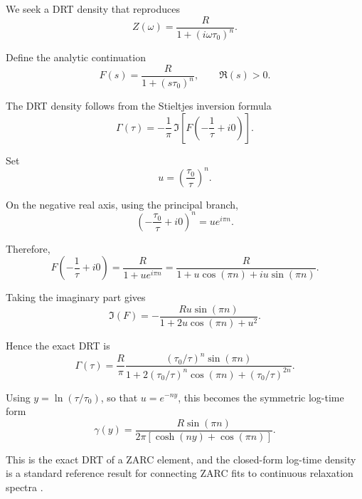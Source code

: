 \documentclass[11pt]{article}
\begin{document}
We seek a DRT density that reproduces
\begin{equation}
Z(\omega) = \frac{R}{1 + (i\omega\tau_0)^n}.
\end{equation}

Define the analytic continuation
\begin{equation}
F(s) = \frac{R}{1 + (s\tau_0)^n}, \qquad \Re(s) > 0.
\end{equation}

The DRT density follows from the Stieltjes inversion formula
\begin{equation}
\Gamma(\tau) = -\frac{1}{\pi} \, \Im\left[F\left(-\frac{1}{\tau} + i0\right)\right].
\end{equation}

Set
\begin{equation}
u = \left(\frac{\tau_0}{\tau}\right)^n.
\end{equation}

On the negative real axis, using the principal branch,
\begin{equation}
\left(-\frac{\tau_0}{\tau} + i0\right)^n = u e^{i\pi n}.
\end{equation}

Therefore,
\begin{equation}
F\left(-\frac{1}{\tau} + i0\right) = \frac{R}{1 + u e^{i\pi n}} = \frac{R}{1 + u\cos(\pi n) + i u\sin(\pi n)}.
\end{equation}

Taking the imaginary part gives
\begin{equation}
\Im(F) = -\frac{R u \sin(\pi n)}{1 + 2u\cos(\pi n) + u^2}.
\end{equation}

Hence the exact DRT is
\begin{equation}
\Gamma(\tau) = \frac{R}{\pi}
\frac{\left(\tau_0/\tau\right)^n \sin(\pi n)}{1 + 2\left(\tau_0/\tau\right)^n \cos(\pi n) + \left(\tau_0/\tau\right)^{2n}}.
\end{equation}

Using $y = \ln(\tau/\tau_0)$, so that $u = e^{-ny}$, this becomes the symmetric log-time form
\begin{equation}
\gamma(y) = \frac{R\sin(\pi n)}{2\pi\left[\cosh(ny) + \cos(\pi n)\right]}.
\end{equation}

This is the exact DRT of a ZARC element, and the closed-form log-time density is a standard reference result for connecting ZARC fits to continuous relaxation spectra \cite{cordoba2018,macutkevic2004}.
\end{document}
